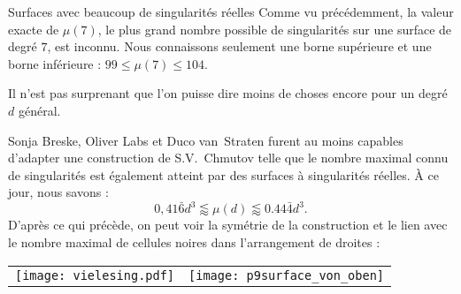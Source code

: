 \begin{surferPage}[216 Singularités]{Surfaces avec beaucoup de singularités réelles}
    Comme vu précédemment, la valeur exacte de $\mu(7)$, le plus grand nombre possible
    de singularités sur une surface de degré $7$, est inconnu.
    Nous connaissons seulement une borne supérieure et une borne inférieure : $99\le \mu(7) \le 104$. 


    Il n'est pas surprenant que l'on puisse dire moins de choses encore pour un degré $d$ général.

    Sonja Breske, Oliver Labs et Duco van~Straten furent au moins capables d'adapter
    une construction de S.V.\ Chmutov telle que le nombre maximal connu
    de singularités est également atteint par des surfaces à 
    singularités réelles. 
    \`A ce jour, nous savons :
    \[0,41\bar{6}d^3 \lessapprox \mu(d) \lessapprox 0.44\bar{4} d^3.\]
     D'après ce qui précède, on peut voir la symétrie de la construction et le lien avec 
    le nombre maximal de cellules noires dans l'arrangement de droites :
    \begin{center}
      \begin{tabular}{c@{\qquad}c}
        \texttt{[image: vielesing.pdf]}
        &
        \texttt{[image: p9surface\_von\_oben]}
      \end{tabular}
    \end{center}
\end{surferPage}
